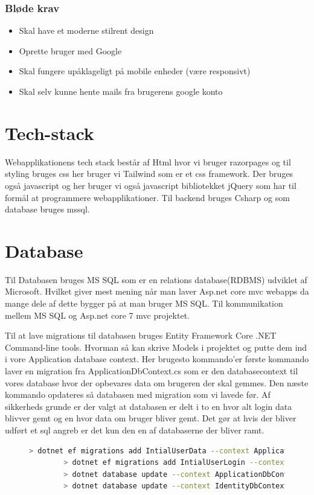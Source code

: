 \subsubsection{Bløde krav}
\begin{itemize}
    \item Skal have et moderne stilrent design
    \item Oprette bruger med Google
    \item Skal fungere upåklageligt på mobile enheder (være responsivt)
    \item Skal selv kunne hente mails fra brugerens google konto
\end{itemize}
\section{Tech-stack}
Webapplikationens tech stack består af Html hvor vi bruger razorpages og til styling bruges css her bruger vi Tailwind som er et
css framework. Der bruges også javascript og her bruger vi også javascript bibliotekket jQuery som har til formål
at programmere webapplikationer. Til backend bruges Csharp og som database bruges mssql.
\section{Database}
Til Databasen bruges MS SQL som er en relations database(RDBMS) udviklet af Microsoft. Hvilket
giver mest mening når man laver Asp.net core mvc webapps da mange dele af dette bygger på at man bruger
MS SQL. Til kommunikation mellem MS SQL og Asp.net core 7 mvc projektet.    

Til at lave migrations til databasen bruges Entity Framework Core .NET Command-line tools. 
Hvorman så kan skrive Models i projektet og putte dem ind i vore Application database 
context. Her brugesto kommando'er første kommando laver en migration fra ApplicationDbContext.cs 
som er den databasecontext til vores database hvor der opbevares data om brugeren der skal gemmes. 
Den næste kommando opdateres så databasen med migration som vi lavede før. Af sikkerheds grunde er der 
valgt at databasen er delt i to en hvor alt login data blivver gemt og en hvor data om bruger bliver gemt.
Det gør at hvis der bliver udført et sql angreb er det kun den en af databaserne der bliver ramt.

\begin{figure}[!h]
    \begin{lstlisting}[language=bash]
        > dotnet ef migrations add IntialUserData --context ApplicationDbContext
        > dotnet ef migrations add IntialUserLogin --context IdentityDbContext
        > dotnet database update --context ApplicationDbContext
        > dotnet database update --context IdentityDbContext
    \end{lstlisting}
\end{figure}

